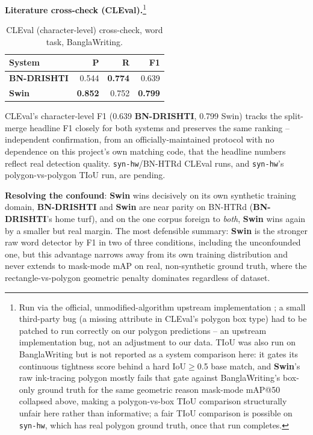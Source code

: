 \documentclass[10pt]{article}
\newcommand{\swin}{\textbf{Swin}}
\newcommand{\bnd}{\textbf{BN-DRISHTI}}
\begin{document}
\textbf{Literature cross-check (CLEval).}\footnote{Run via the official,
unmodified-algorithm upstream implementation \cite{baek2020cleval}; a small third-party
bug (a missing attribute in CLEval's polygon box type) had to be patched to run correctly
on our polygon predictions -- an upstream implementation bug, not an adjustment to our
data. TIoU \cite{liu2019tiou} was also run on BanglaWriting but is not reported as a
system comparison here: it gates its continuous tightness score behind a hard
IoU$\geq$0.5 base match, and \swin's raw ink-tracing polygon mostly fails that gate
against BanglaWriting's box-only ground truth for the same geometric reason mask-mode
mAP@50 collapsed above, making a polygon-vs-box TIoU comparison structurally unfair here
rather than informative; a fair TIoU comparison is possible on \texttt{syn-hw}, which has
real polygon ground truth, once that run completes.}

\begin{table}[H]
\centering
\footnotesize
\caption{CLEval (character-level) cross-check, word task, BanglaWriting.}
\begin{tabular}{@{}lrrr@{}}
\toprule
System & P & R & F1 \\
\midrule
\bnd{}         & 0.544 & \textbf{0.774} & 0.639 \\
\textbf{Swin} & \textbf{0.852} & 0.752 & \textbf{0.799} \\
\bottomrule
\end{tabular}
\end{table}

CLEval's character-level F1 (0.639 \bnd{}, 0.799 Swin) tracks the split-merge headline
F1 closely for both systems and preserves the same ranking -- independent confirmation,
from an officially-maintained protocol with no dependence on this project's own matching
code, that the headline numbers reflect real detection quality. \texttt{syn-hw}/BN-HTRd
CLEval runs, and \texttt{syn-hw}'s polygon-vs-polygon TIoU run, are pending.

\textbf{Resolving the confound}: \swin{} wins decisively on its own synthetic training
domain, \bnd{} and \swin{} are near parity on BN-HTRd (\bnd's home turf), and on the
one corpus foreign to \emph{both}, \swin{} wins again by a smaller but real margin.
The most defensible summary: \swin{} is the stronger raw word detector by F1 in two of
three conditions, including the unconfounded one, but this advantage narrows away
from its own training distribution and never extends to mask-mode mAP on real,
non-synthetic ground truth, where the rectangle-vs-polygon geometric penalty
dominates regardless of dataset.
\end{document}
